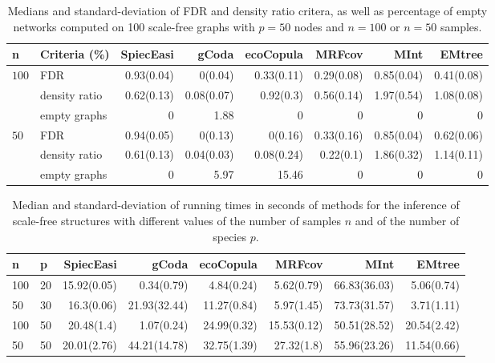 \begin{table}[ht]
\centering
\begin{tabular}{l|l|rrrrrr}
   n & Criteria (\%) & SpiecEasi & gCoda & ecoCopula & MRFcov & MInt & EMtree \\ 
  \hline
\multirow{3}{*}{{$100$}} & FDR& 0.93(0.04) & 0(0.04) & 0.33(0.11) & 0.29(0.08) & 0.85(0.04) & 0.41(0.08) \\ 
  & density ratio & 0.62(0.13) & 0.08(0.07) & 0.92(0.3) & 0.56(0.14) & 1.97(0.54) & 1.08(0.08) \\ 
  & empty graphs & 0 & 1.88 & 0 & 0 & 0 & 0 \\  \hline
 \multirow{3}{*}{{$50$}} & FDR & 0.94(0.05) & 0(0.13) & 0(0.16) & 0.33(0.16) & 0.85(0.04) & 0.62(0.06) \\ 
 & density ratio & 0.61(0.13) & 0.04(0.03) & 0.08(0.24) & 0.22(0.1) & 1.86(0.32) & 1.14(0.11) \\  
  & empty graphs & 0& 5.97 & 15.46 & 0 & 0 & 0 \\  \hline
\end{tabular}
\caption{Medians and standard-deviation of FDR and density ratio critera, as well as percentage of empty networks computed on 100 scale-free graphs with $p=50$ nodes and $n=100$ or $n=50$ samples.}
\label{perfSF50}
\end{table}

\begin{table}[ht]
\centering
\begin{tabular}{ll|rrrrrr}
 
n & p & SpiecEasi & gCoda & ecoCopula & MRFcov & MInt & EMtree \\ 
  \hline
  100 & 20 & 15.92(0.05) & 0.34(0.79) & 4.84(0.24) & 5.62(0.79) & 66.83(36.03) & 5.06(0.74) \\    
  50 & 30   & 16.3(0.06) & 21.93(32.44) & 11.27(0.84) & 5.97(1.45) & 73.73(31.57) & 3.71(1.11) \\   \hline
  100 & 50 & 20.48(1.4) & 1.07(0.24) & 24.99(0.32) & 15.53(0.12) & 50.51(28.52) & 20.54(2.42) \\   
  50 & 50   & 20.01(2.76) & 44.21(14.78) & 32.75(1.39) & 27.32(1.8) & 55.96(23.26) & 11.54(0.66) \\ \hline
\end{tabular}
\caption{Median and standard-deviation of running times in seconds  of methods for the inference of scale-free structures with different values of the number of samples $n$ and of the number of species $p$. }
\label{timeSF}
\end{table}

